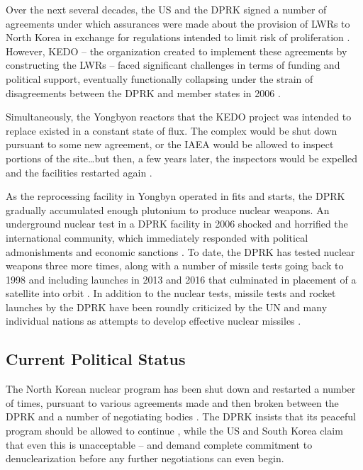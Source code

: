 \documentclass{article}
\begin{document}
Over the next several decades, the US and the DPRK signed a number of agreements under which assurances were made about the provision of LWRs to North Korea in exchange for regulations intended to limit risk of proliferation \cite{agreed, davenport}. However, KEDO – the organization created to implement these agreements by constructing the LWRs – faced significant challenges in terms of funding and political support, eventually functionally collapsing under the strain of disagreements between the DPRK and member states in 2006 \cite{kedohist}.

Simultaneously, the Yongbyon reactors that the KEDO project was intended to replace existed in a constant state of flux. The complex would be shut down pursuant to some new agreement, or the IAEA would be allowed to inspect portions of the site…but then, a few years later, the inspectors would be expelled and the facilities restarted again \cite{davenport,nti15,iaea09}.

As the reprocessing facility in Yongbyn operated in fits and starts, the DPRK gradually accumulated enough plutonium to produce nuclear weapons. An underground nuclear test in a DPRK facility in 2006 shocked and horrified the international community, which immediately responded with political admonishments and economic sanctions \cite{davenport}. To date, the DPRK has tested nuclear weapons three more times, along with a number of missile tests going back to 1998 \cite{orfall} and including launches in 2013 and 2016 that culminated in placement of a satellite into orbit \cite{davenport}. In addition to the nuclear tests, missile tests and rocket launches by the DPRK have been roundly criticized by the UN and many individual nations as attempts to develop effective nuclear missiles \cite{unApr12}.


\subsection{Current Political Status}

The North Korean nuclear program has been shut down and restarted a number of times, pursuant to various agreements made and then broken between the DPRK and a number of negotiating bodies \cite{bajoria,davenport}. The DPRK insists that its peaceful program should be allowed to continue \cite{kcna2}, while the US and South Korea claim that even this is unacceptable \cite{lee} – and demand complete commitment to denuclearization before any further negotiations can even begin.
\end{document}
